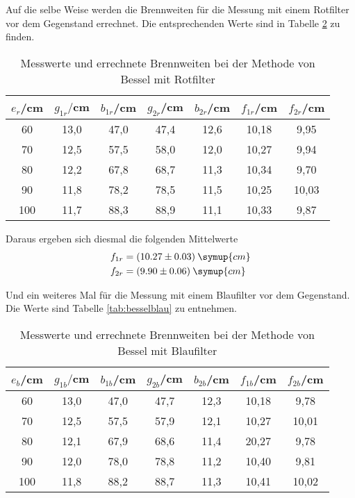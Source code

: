 Auf die selbe Weise werden die Brennweiten für die Messung mit einem Rotfilter vor dem Gegenstand errechnet. Die
entsprechenden Werte sind in Tabelle \ref{tab:besselrot} zu finden.
\begin{table}[H]
  \centering
  \caption{Messwerte und errechnete Brennweiten bei der Methode von Bessel mit Rotfilter}
  \label{tab:besselrot}
  \begin{tabular}{c c c c c c c}
    \toprule
    $e_r$/cm  & $g_{1r}/$cm & $b_{1r}$/cm & $g_{2r}$/cm & $b_{2r}$/cm & $f_{1r}$/cm & $f_{2r}$/cm \\
    \midrule
    60  &   13,0 &  47,0  &  47,4  &  12,6 & 10,18 & 9,95  \\
    70   &  12,5 &  57,5  &  58,0  &  12,0 & 10,27 & 9,94 \\
    80   &  12,2 &  67,8  &  68,7  &  11,3 & 10,34 & 9,70 \\
    90   &  11,8 &  78,2  &  78,5  &  11,5 & 10,25 & 10,03 \\
    100  &  11,7 &  88,3  &  88,9  &  11,1 & 10,33 & 9,87 \\
    \bottomrule
  \end{tabular}
\end{table}

Daraus ergeben sich diesmal die folgenden Mittelwerte
\begin{align*}
  &f_{1r} = (10.27 \pm 0.03) \: \symup{cm} \\
  &f_{2r} = (9.90 \pm 0.06) \: \symup{cm}
\end{align*}

Und ein weiteres Mal für die Messung mit einem Blaufilter vor dem Gegenstand. Die Werte sind Tabelle
\ref{tab:besselblau} zu entnehmen.
\begin{table}[H]
  \centering
  \caption{Messwerte und errechnete Brennweiten bei der Methode von Bessel mit Blaufilter}
  \label{tab:besselrot}
  \begin{tabular}{c c c c c c c}
    \toprule
    $e_b$/cm  & $g_{1b}/$cm & $b_{1b}$/cm & $g_{2b}$/cm & $b_{2b}$/cm & $f_{1b}$/cm & $f_{2b}$/cm \\
    \midrule
    60  &   13,0 &  47,0  &  47,7  &  12,3 & 10,18 & 9,78 \\
    70   &  12,5 &  57,5  &  57,9  &  12,1 & 10,27 & 10,01 \\
    80   &  12,1 &  67,9  &  68,6  &  11,4 & 20,27 & 9,78 \\
    90   &  12,0 &  78,0  &  78,8  &  11,2 & 10,40 & 9,81 \\
    100  &  11,8 &  88,2  &  88,7  &  11,3 & 10,41 & 10,02 \\
    \bottomrule
  \end{tabular}
\end{table}

